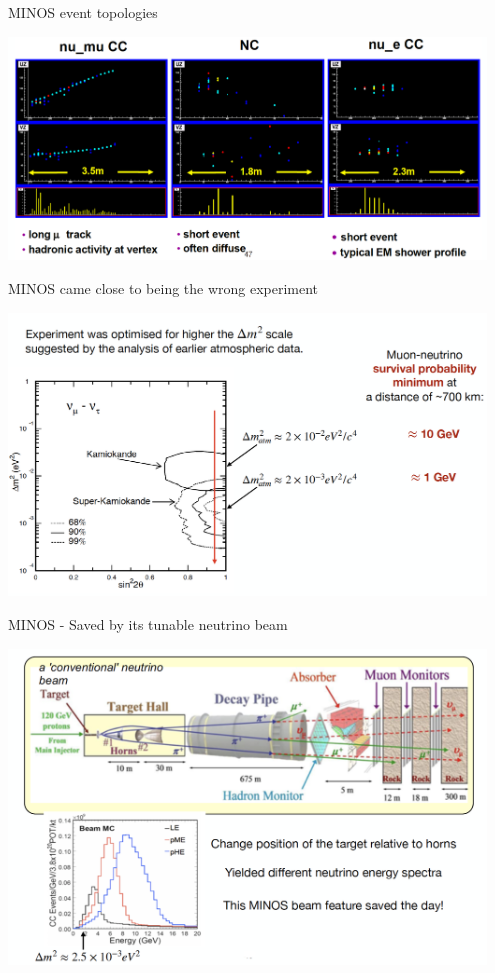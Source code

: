 \begin{frame}[t]{MINOS event topologies}
  \begin{center}
  \includegraphics[width=0.95\textwidth]{./images/3nu/accelerator/minos_events.png}\\
  \end{center}
\end{frame}


\begin{frame}[t]{MINOS came close to being the wrong experiment}
  \begin{center}
  \includegraphics[width=0.95\textwidth]{./images/3nu/accelerator/minos_wrong_dmsq.png}\\
  \end{center}
\end{frame}

\begin{frame}[t]{MINOS - Saved by its tunable neutrino beam}
  \begin{center}
  \includegraphics[width=0.95\textwidth]{./images/3nu/accelerator/minos_tunable_beam.png}\\
  \end{center}
\end{frame}


